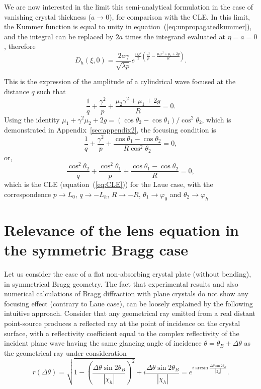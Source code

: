 \documentclass[preprint]{iucr}              %
\newcommand{\inred}[1]{{\color{red}#1}}
\begin{document}
We are now interested in the limit this \inred{semi-analytical} formulation in the case of vanishing crystal thickness ($a\rightarrow0{}$), for comparison with the CLE. In this limit, the Kummer function is equal to unity in equation~(\ref{eq:unpropagatedkummer}), and the integral can be replaced by $2a$ times the integrand evaluated at $\eta=a=0$, therefore
\begin{equation}
\label{eq:14reduced}
    D_h(\xi,0) = \frac{2 a \gamma}{\sqrt{\lambda p}} e^{\frac{i k \xi^2}{2}(\frac{\gamma^2}{p}-\frac{\mu_2\gamma^2+\mu_1+2g}{R})}.
\end{equation}

This is the expression of the amplitude of a cylindrical wave focused at the distance $q$ such that
\begin{equation}
    \frac{1}{q}+\frac{\gamma^2}{p}+\frac{\mu_2\gamma^2+\mu_1+2g}{R}=0. 
\end{equation}
Using the identity $\mu_1+\gamma^2\mu_2+2g=(\cos\theta_2-\cos\theta_1)/\cos^2\theta_2$, which is demonstrated in Appendix~\ref{sec:appendix2}, the focusing condition is 
\begin{equation}
    \frac{1}{q}+\frac{\gamma^2}{p}+\frac{\cos\theta_1-\cos\theta_2}{R\cos^2\theta_2}=0,
\end{equation}
or,
\begin{equation}
    \frac{\cos^2\theta_2}{q}+\frac{\cos^2\theta_1}{p}+\frac{\cos\theta_1-\cos\theta_2}{R}=0,
\end{equation}
which is the CLE (equation~(\ref{eq:CLE})) for the Laue case, with the correspondence $p \rightarrow L_0$, $q \rightarrow -L_h$, $R \rightarrow -R$, $\theta_1 \rightarrow \varphi_0$ and $\theta_2 \rightarrow \varphi_h$


\section{Relevance of the lens equation in the symmetric Bragg case}
\label{sec:BraggGeometry}
Let us consider the case of a flat non-absorbing crystal plate (without bending), in symmetrical Bragg geometry. The fact that experimental results and also numerical calculations \cite{Honkanen2018} of Bragg diffraction with plane crystals do not show any focusing effect (contrary to Laue case), can be loosely explained by the following intuitive approach. Consider that any geometrical ray emitted from a real distant point-source produces a reflected ray at the point of incidence on the crystal surface, with a reflectivity coefficient equal to the complex reflectivity of the incident plane wave having the same glancing angle of incidence $\theta=\theta_B+\Delta\theta$ as the geometrical ray under consideration
\begin{equation}
\label{eq:braggDiffProfile}
    r(\Delta\theta) = \sqrt{1-\left(\frac{\Delta\theta\sin2\theta_B}{|\chi_h|}\right)^2} + i \frac{\Delta\theta\sin2\theta_B}{|\chi_h|} =
    e^{i \arcsin{\frac{\Delta\theta \sin2\theta_B}{ |\chi_h|}}}.
\end{equation}
\end{document}
